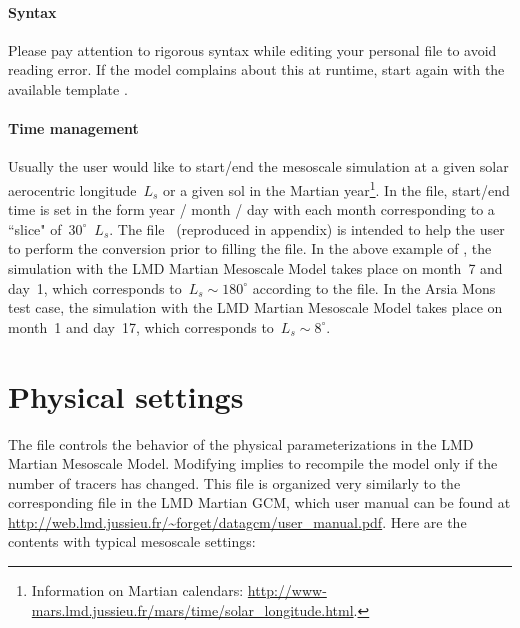 \paragraph{Syntax} Please pay attention to rigorous syntax while editing your personal  file to avoid reading error. If the model complains about this at runtime, start again with the available template .

\paragraph{Time management} Usually the user would like to start/end the mesoscale simulation at a given solar aerocentric longitude~$L_s$ or a given sol in the Martian year\footnote{Information on Martian calendars: \url{http://www-mars.lmd.jussieu.fr/mars/time/solar_longitude.html}.}. In the  file, start/end time is set in the form year / month / day with each month corresponding to a ``slice" of~$30^{\circ}$~$L_s$. The file~ (reproduced in appendix) is intended to help the user to perform the conversion prior to filling the  file. In the above example of , the simulation with the LMD Martian Mesoscale Model takes place on month~7 and day~1, which corresponds to~$L_s \sim 180^{\circ}$ according to the  file. In the Arsia Mons test case, the simulation with the LMD Martian Mesoscale Model takes place on month~1 and day~17, which corresponds to~$L_s \sim 8^{\circ}$.

\mk
\section{Physical settings}

\mk
The file  controls the behavior of the physical parameterizations in the LMD Martian Mesoscale Model. Modifying  implies to recompile the model only if the number of tracers has changed. This file is organized very similarly to the corresponding file in the LMD Martian GCM, which user manual can be found at \url{http://web.lmd.jussieu.fr/~forget/datagcm/user_manual.pdf}. Here are the  contents with typical mesoscale settings:

\vskip -0.5cm

